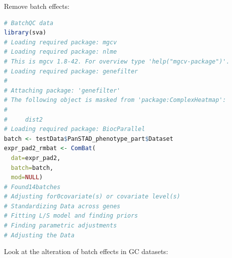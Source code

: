 \documentclass[
  12pt,
]{book}
\begin{document}
Remove batch effects:

\begin{lstlisting}[language=R]
# BatchQC data
library(sva)
# Loading required package: mgcv
# Loading required package: nlme
# This is mgcv 1.8-42. For overview type 'help("mgcv-package")'.
# Loading required package: genefilter
# 
# Attaching package: 'genefilter'
# The following object is masked from 'package:ComplexHeatmap':
# 
#     dist2
# Loading required package: BiocParallel
batch <- testData$PanSTAD_phenotype_part$Dataset
expr_pad2_rmbat <- ComBat(
  dat=expr_pad2,
  batch=batch, 
  mod=NULL)
# Found14batches
# Adjusting for0covariate(s) or covariate level(s)
# Standardizing Data across genes
# Fitting L/S model and finding priors
# Finding parametric adjustments
# Adjusting the Data
\end{lstlisting}

Look at the alteration of batch effects in GC datasets:
\end{document}

